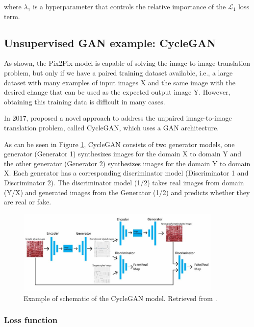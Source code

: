 where $\lambda_1$ is a hyperparameter that controls the relative importance of the $\mathcal{L}_{1}$ loss term. 

\subsection{Unsupervised GAN example: CycleGAN}
\label{subsection:CycleGAN}

As shown, the Pix2Pix model is capable of solving the image-to-image translation problem, but only if we have a paired training dataset available, i.e., a large dataset with many examples of input images X and the same image with the desired change that can be used as the expected output image Y. However, obtaining this training data is difficult in many cases. 

In 2017, \citet{cycleGAN:original} proposed a novel approach to address the unpaired image-to-image translation problem, called CycleGAN, which uses a \ac{GAN} architecture. 

As can be seen in Figure \ref{fig:cyclegan}, CycleGAN consists of two generator models, one generator (Generator 1) synthesizes images for the domain X to domain Y and the other generator (Generator 2) synthesizes images for the domain Y to domain X. Each generator has a corresponding discriminator model (Discriminator 1 and Discriminator 2). The discriminator model (1/2) takes real images from domain (Y/X) and generated images from the Generator (1/2) and predicts whether they are real or fake. 

\begin{figure}[!htb]
  \centering
  \includegraphics[width=0.90\textwidth]{Images/Data-flow-of-CycleGAN-in-this-research.jpg}
  \caption[Example of schematic of the CycleGAN model.]{Example of schematic of the CycleGAN model. Retrieved from \cite{cyclegan:image}.}
  \label{fig:cyclegan}
\end{figure}

\subsubsection*{Loss function}

